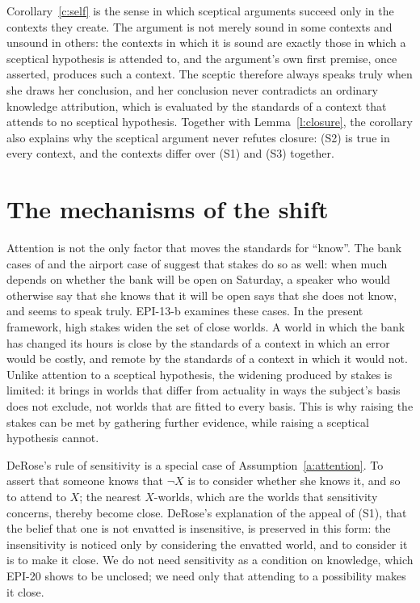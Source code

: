 \documentclass{situationist-preprint}
\begin{document}
Corollary~\ref{c:self} is the sense in which sceptical arguments succeed only in the contexts they create. The argument is not merely sound in some contexts and unsound in others: the contexts in which it is sound are exactly those in which a sceptical hypothesis is attended to, and the argument's own first premise, once asserted, produces such a context. The sceptic therefore always speaks truly when she draws her conclusion, and her conclusion never contradicts an ordinary knowledge attribution, which is evaluated by the standards of a context that attends to no sceptical hypothesis. Together with Lemma~\ref{l:closure}, the corollary also explains why the sceptical argument never refutes closure: (S2) is true in every context, and the contexts differ over (S1) and (S3) together.

\section{The mechanisms of the shift}

Attention is not the only factor that moves the standards for \enquote{know}. The bank cases of \citet{DeRose1992} and the airport case of \citet{Cohen1999} suggest that stakes do so as well: when much depends on whether the bank will be open on Saturday, a speaker who would otherwise say that she knows that it will be open says that she does not know, and seems to speak truly. EPI-13-b examines these cases. In the present framework, high stakes widen the set of close worlds. A world in which the bank has changed its hours is close by the standards of a context in which an error would be costly, and remote by the standards of a context in which it would not. Unlike attention to a sceptical hypothesis, the widening produced by stakes is limited: it brings in worlds that differ from actuality in ways the subject's basis does not exclude, not worlds that are fitted to every basis. This is why raising the stakes can be met by gathering further evidence, while raising a sceptical hypothesis cannot.

DeRose's rule of sensitivity is a special case of Assumption~\ref{a:attention}. To assert that someone knows that $\neg X$ is to consider whether she knows it, and so to attend to $X$; the nearest $X$-worlds, which are the worlds that sensitivity concerns, thereby become close. DeRose's explanation of the appeal of (S1), that the belief that one is not envatted is insensitive, is preserved in this form: the insensitivity is noticed only by considering the envatted world, and to consider it is to make it close. We do not need sensitivity as a condition on knowledge, which EPI-20 shows to be unclosed; we need only that attending to a possibility makes it close.
\end{document}
